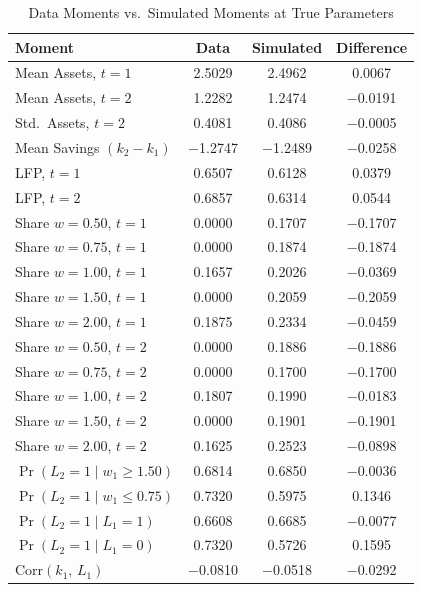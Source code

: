 \begin{table}[htbp]
\centering
\caption{Data Moments vs.\ Simulated Moments at True Parameters}
\begin{tabular}{lccc}
\toprule
Moment & Data & Simulated & Difference \\
\midrule
Mean Assets, $t=1$                & 2.5029    & 2.4962    & \phantom{$-$}0.0067  \\
Mean Assets, $t=2$                & 1.2282    & 1.2474    & $-$0.0191            \\
Std.\ Assets, $t=2$               & 0.4081    & 0.4086    & $-$0.0005            \\
Mean Savings $(k_2 - k_1)$        & $-$1.2747 & $-$1.2489 & $-$0.0258            \\
LFP, $t=1$                        & 0.6507    & 0.6128    & \phantom{$-$}0.0379  \\
LFP, $t=2$                        & 0.6857    & 0.6314    & \phantom{$-$}0.0544  \\
Share $w=0.50$, $t=1$             & 0.0000    & 0.1707    & $-$0.1707            \\
Share $w=0.75$, $t=1$             & 0.0000    & 0.1874    & $-$0.1874            \\
Share $w=1.00$, $t=1$             & 0.1657    & 0.2026    & $-$0.0369            \\
Share $w=1.50$, $t=1$             & 0.0000    & 0.2059    & $-$0.2059            \\
Share $w=2.00$, $t=1$             & 0.1875    & 0.2334    & $-$0.0459            \\
Share $w=0.50$, $t=2$             & 0.0000    & 0.1886    & $-$0.1886            \\
Share $w=0.75$, $t=2$             & 0.0000    & 0.1700    & $-$0.1700            \\
Share $w=1.00$, $t=2$             & 0.1807    & 0.1990    & $-$0.0183            \\
Share $w=1.50$, $t=2$             & 0.0000    & 0.1901    & $-$0.1901            \\
Share $w=2.00$, $t=2$             & 0.1625    & 0.2523    & $-$0.0898            \\
$\Pr(L_2=1 \mid w_1 \geq 1.50)$   & 0.6814    & 0.6850    & $-$0.0036            \\
$\Pr(L_2=1 \mid w_1 \leq 0.75)$   & 0.7320    & 0.5975    & \phantom{$-$}0.1346  \\
$\Pr(L_2=1 \mid L_1=1)$           & 0.6608    & 0.6685    & $-$0.0077            \\
$\Pr(L_2=1 \mid L_1=0)$           & 0.7320    & 0.5726    & \phantom{$-$}0.1595  \\
$\mathrm{Corr}(k_1,\, L_1)$       & $-$0.0810 & $-$0.0518 & $-$0.0292            \\
\bottomrule
\end{tabular}
\end{table}

